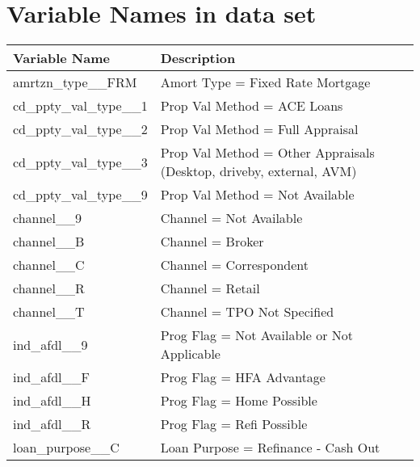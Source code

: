 \appendix
\chapter{Variable Names in data set}
\begin{longtable}{lp{8cm}}\toprule
\textbf{Variable Name}             & \textbf{Description}                                                 \\\midrule
\endfirsthead
%
\endhead
%
amrtzn\_type\_\_FRM                & Amort Type = Fixed Rate Mortgage                                     \\\hline
cd\_ppty\_val\_type\_\_1           & Prop Val Method = ACE Loans                                          \\
cd\_ppty\_val\_type\_\_2           & Prop Val Method = Full Appraisal                                     \\
cd\_ppty\_val\_type\_\_3           & Prop Val Method = Other Appraisals (Desktop, driveby, external, AVM) \\
cd\_ppty\_val\_type\_\_9           & Prop Val Method = Not Available                                      \\\hline
channel\_\_9                       & Channel = Not Available                                              \\
channel\_\_B                       & Channel = Broker                                                     \\
channel\_\_C                       & Channel = Correspondent                                              \\
channel\_\_R                       & Channel = Retail                                                     \\
channel\_\_T                       & Channel = TPO Not Specified                                          \\\hline
ind\_afdl\_\_9                     & Prog Flag = Not Available or Not Applicable                          \\
ind\_afdl\_\_F                     & Prog Flag = HFA Advantage                                            \\
ind\_afdl\_\_H                     & Prog Flag = Home Possible                                            \\
ind\_afdl\_\_R                     & Prog Flag = Refi Possible                                            \\\hline
loan\_purpose\_\_C                 & Loan Purpose = Refinance - Cash Out                                  \\

\end{longtable}
